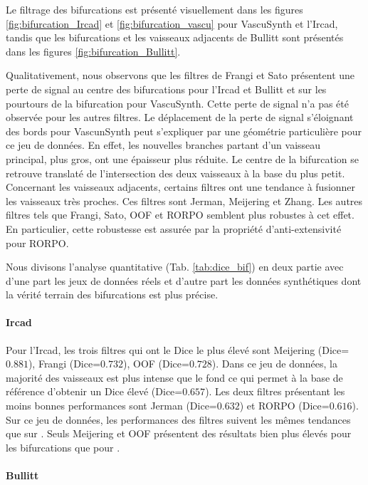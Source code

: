 Le filtrage des bifurcations est présenté visuellement dans les figures \ref{fig:bifurcation_Ircad} et \ref{fig:bifurcation_vascu} pour VascuSynth et l'Ircad, tandis que les bifurcations et les vaisseaux adjacents de Bullitt sont présentés dans les figures \ref{fig:bifurcation_Bullitt}.

Qualitativement, nous observons que les filtres de Frangi et Sato présentent une perte de signal au centre des bifurcations pour l'Ircad et Bullitt et sur les pourtours de la bifurcation pour VascuSynth. Cette perte de signal n'a pas été observée pour les autres filtres. Le déplacement de la perte de signal s'éloignant des bords pour VascunSynth peut s'expliquer par une géométrie particulière pour ce jeu de données. En effet, les nouvelles branches partant d'un vaisseau principal, plus gros, ont une épaisseur plus réduite. Le centre de la bifurcation se retrouve translaté de l'intersection des deux vaisseaux à la base du plus petit. Concernant les vaisseaux adjacents, certains filtres ont une tendance à fusionner les vaisseaux très proches. Ces filtres sont Jerman, Meijering et Zhang. Les autres filtres tels que Frangi, Sato, OOF et RORPO semblent plus robustes à cet effet. En particulier, cette robustesse est assurée par la propriété d'anti-extensivité pour RORPO.

Nous divisons l'analyse quantitative (Tab. \ref{tab:dice_bif}) en deux partie avec d'une part les jeux de données réels et d'autre part les données synthétiques dont la vérité terrain des bifurcations est plus précise.

\paragraph{Ircad}

Pour l'Ircad, les trois filtres qui ont le Dice le plus élevé sont Meijering (Dice=$0.881$), Frangi (Dice=$0.732$), OOF (Dice=$0.728$). Dans ce jeu de données, la majorité des vaisseaux est plus intense que le fond ce qui permet à la base de référence d'obtenir un Dice élevé (Dice=$0.657$). Les deux filtres présentant les moins bonnes performances sont Jerman (Dice=$0.632$) et RORPO (Dice=$0.616$). Sur ce jeu de données, les performances des filtres suivent les mêmes tendances que sur \maskvascular. Seuls Meijering et OOF présentent des résultats bien plus élevés pour les bifurcations que pour \maskvascular.

\paragraph{Bullitt}

